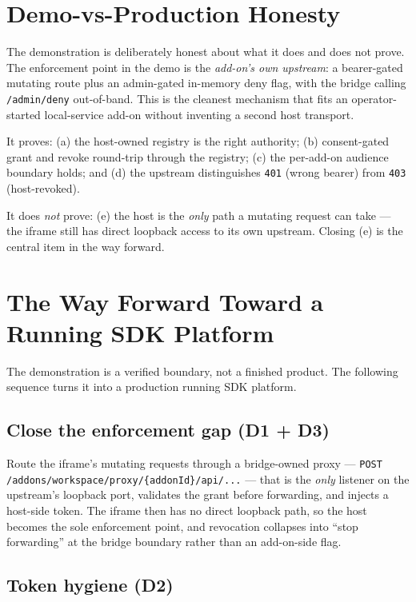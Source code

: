\documentclass[11pt]{article}
\begin{document}
\section{Demo-vs-Production Honesty}

The demonstration is deliberately honest about what it does and does not prove.
The enforcement point in the demo is the \emph{add-on's own upstream}: a
bearer-gated mutating route plus an admin-gated in-memory deny flag, with the
bridge calling \texttt{/admin/deny} out-of-band. This is the cleanest mechanism
that fits an operator-started local-service add-on without inventing a second
host transport.

It proves: (a) the host-owned registry is the right authority; (b)
consent-gated grant and revoke round-trip through the registry; (c) the
per-add-on audience boundary holds; and (d) the upstream distinguishes
\texttt{401} (wrong bearer) from \texttt{403} (host-revoked).

It does \emph{not} prove: (e) the host is the \emph{only} path a mutating
request can take --- the iframe still has direct loopback access to its own
upstream. Closing (e) is the central item in the way forward.

\section{The Way Forward Toward a Running SDK Platform}

The demonstration is a verified boundary, not a finished product. The
following sequence turns it into a production running SDK platform.

\subsection{Close the enforcement gap (D1 + D3)}

Route the iframe's mutating requests through a bridge-owned proxy ---
\texttt{POST /addons/workspace/proxy/\allowbreak\{addonId\}/api/...} --- that is the
\emph{only} listener on the upstream's loopback port, validates the grant
before forwarding, and injects a host-side token. The iframe then has no direct
loopback path, so the host becomes the sole enforcement point, and revocation
collapses into ``stop forwarding'' at the bridge boundary rather than an
add-on-side flag.

\subsection{Token hygiene (D2)}
\end{document}
